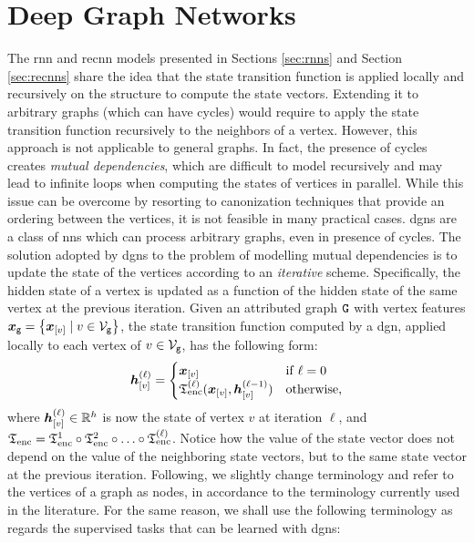 \section{Deep Graph Networks} \label{sec:dgns}
The \gls{rnn} and \gls{recnn} models presented in Sections \ref{sec:rnns} and Section \ref{sec:recnns} share the idea that the state transition function is applied locally and recursively on the structure to compute the state vectors. Extending it to arbitrary graphs (which can have cycles) would require to apply the state transition function recursively to the neighbors of a vertex. However, this approach is not applicable to general graphs. In fact, the presence of cycles creates \emph{mutual dependencies}, which are difficult to model recursively and may lead to infinite loops when computing the states of vertices in parallel. While this issue can be overcome by resorting to canonization techniques that provide an ordering between the vertices, it is not feasible in many practical cases. \glspl{dgn} are a class of \glspl{nn} which can process arbitrary graphs, even in presence of cycles. The solution adopted by \glspl{dgn} to the problem of modelling mutual dependencies is to update the state of the vertices according to an \emph{iterative} scheme. Specifically, the hidden state of a vertex is updated as a function of the hidden state of the same vertex at the previous iteration. Given an attributed graph $\AttrGraph{g}$ with vertex features $\GraphFeatures{x}{g} = \Set{\Elem{x}{v} \mid v \in \Nodes{g}}$, the state transition function computed by a \gls{dgn}, applied locally to each vertex of $v \in \Nodes{g}$, has the following form:
\begin{align*}
    \StateVector{v}{\ell}=
    \begin{cases}
        \Elem{x}{v} & \mathrm{if}\; \ell = 0\\
        \EncTrans^{(\ell)}(\Elem{x}{v}, \StateVector{v}{\ell-1}) & \mathrm{otherwise},
    \end{cases}
\end{align*}
where $\StateVector{v}{\ell} \in \Real^h$ is now the state of vertex $v$ at iteration $\ell$, and $\mathfrak{T}_{\mathrm{enc}} = \mathfrak{T}_{\mathrm{enc}}^{1} \circ \mathfrak{T}_{\mathrm{enc}}^{2} \circ \ldots \circ \mathfrak{T}_{\mathrm{enc}}^{(\ell)}$. Notice how the value of the state vector does not depend on the value of the neighboring state vectors, but to the same state vector at the previous iteration. Following, we slightly change terminology and refer to the vertices of a graph as nodes, in accordance to the terminology currently used in the literature. For the same reason, we shall use the following terminology as regards the supervised tasks that can be learned with \glspl{dgn}:
